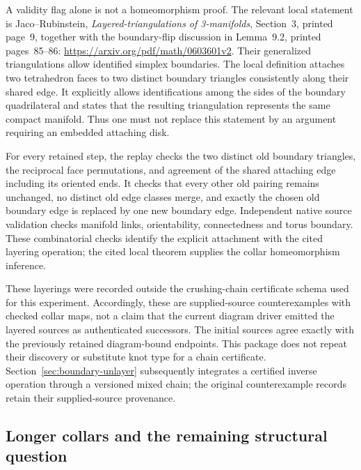 A validity flag alone is not a homeomorphism proof.  The relevant local
statement is Jaco--Rubinstein, \emph{Layered-triangulations of 3-manifolds},
Section~3, printed page~9, together with the boundary-flip
discussion in Lemma~9.2, printed pages~85--86:
\url{https://arxiv.org/pdf/math/0603601v2}.
Their generalized triangulations allow identified simplex boundaries.
The local definition attaches two tetrahedron faces to two distinct
boundary triangles consistently along their shared edge.  It explicitly
allows identifications among the sides of the boundary quadrilateral and
states that the resulting triangulation represents the same compact
manifold.  Thus one must not replace this statement by an argument
requiring an embedded attaching disk.

For every retained step, the replay checks the two distinct old boundary
triangles, the reciprocal face permutations, and agreement of the shared
attaching edge including its oriented ends.  It checks that every other
old pairing remains unchanged, no distinct old edge classes merge, and
exactly the chosen old boundary edge is replaced by one new boundary
edge.  Independent native source validation checks manifold links,
orientability, connectedness and torus boundary.  These combinatorial
checks identify the explicit attachment with the cited layering operation;
the cited local theorem supplies the collar homeomorphism inference.

These layerings were recorded outside the crushing-chain certificate
schema used for this experiment.  Accordingly, these are supplied-source
counterexamples with checked collar maps, not a claim that the current
diagram driver emitted the layered sources as authenticated successors.
The initial sources agree exactly with the previously retained
diagram-bound endpoints.  This package does not repeat their discovery
or substitute knot type for a chain certificate.
Section~\ref{sec:boundary-unlayer} subsequently integrates a certified
inverse operation through a versioned mixed chain; the original
counterexample records retain their supplied-source provenance.

\subsection{Longer collars and the remaining structural question}

